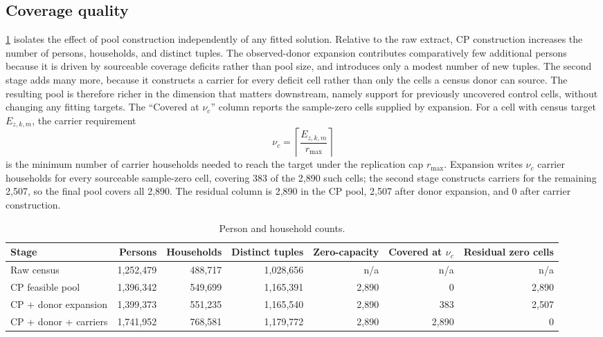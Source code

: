 \documentclass[review]{elsarticle}
\begin{document}
\subsection{Coverage quality}
\label{sec:pool_growth}
\cref{tab:pool_growth} isolates the effect of pool construction independently of any fitted solution. Relative to the raw extract, CP construction increases the number of persons, households, and distinct tuples. The observed-donor expansion contributes comparatively few additional persons because it is driven by sourceable coverage deficits rather than pool size, and introduces only a modest number of new tuples. The second stage adds many more, because it constructs a carrier for every deficit cell rather than only the cells a census donor can source. The resulting pool is therefore richer in the dimension that matters downstream, namely support for previously uncovered control cells, without changing any fitting targets. The ``Covered at $\nu_c$'' column reports the sample-zero cells supplied by expansion. For a cell with census target \(E_{z,k,m}\), the carrier requirement \[ \nu_c=\left\lceil \frac{E_{z,k,m}}{r_{\max}} \right\rceil \] is the minimum number of carrier households needed to reach the target under the replication cap \(r_{\max}\). Expansion writes \(\nu_c\) carrier households for every sourceable sample-zero cell, covering 383 of the 2{,}890 such cells; the second stage constructs carriers for the remaining 2{,}507, so the final pool covers all 2{,}890. The residual column is 2{,}890 in the CP pool, 2{,}507 after donor expansion, and 0 after carrier construction.
\begin{table}[H]
\centering
\caption{Person and household counts.}
\label{tab:pool_growth}
\footnotesize
\setlength{\tabcolsep}{4pt}
\begin{tabular}{@{}lrrrrrr@{}}
\toprule
Stage & Persons & Households & Distinct tuples & Zero-capacity & Covered at \(\nu_c\) & Residual zero cells \\
\midrule
Raw census        & 1{,}252{,}479 & 488{,}717 & 1{,}028{,}656 & n/a & n/a & n/a \\
CP feasible pool  & 1{,}396{,}342 & 549{,}699 & 1{,}165{,}391 & 2{,}890 & 0 & 2{,}890 \\
CP + donor expansion & 1{,}399{,}373 & 551{,}235 & 1{,}165{,}540 & 2{,}890 & 383 & 2{,}507 \\
CP + donor + carriers & 1{,}741{,}952 & 768{,}581 & 1{,}179{,}772 & 2{,}890 & 2{,}890 & 0 \\
\bottomrule
\end{tabular}
\end{table}
\end{document}
